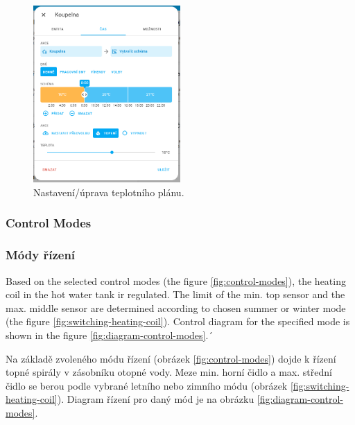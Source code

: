 \begin{Czech}
\begin{figure}[H]
    \centering
    \includegraphics[width=0.5\textwidth]{pictures/czech/software/temperature-plan-thermostat.png}
    \caption{Nastavení/úprava teplotního plánu.}
    \label{fig:temperature-plan-thermostat}
\end{figure}
\end{Czech}


\begin{English}
\subsubsection{Control Modes}
\end{English}

\begin{Czech}
\subsubsection{Módy řízení}
\end{Czech}
\label{sec:control-modes}


\begin{English}
Based on the selected control modes (the figure \ref{fig:control-modes}), the heating coil in the hot water tank ir regulated. The limit of the min. top sensor and the max. middle sensor are determined according to chosen summer or winter mode (the figure \ref{fig:switching-heating-coil}). Control diagram  for the specified mode is shown in the figure \ref{fig:diagram-control-modes}.´
\end{English}

\begin{Czech}
Na základě zvoleného módu řízení (obrázek \ref{fig:control-modes}) dojde k řízení topné spirály v zásobníku otopné vody. Meze min. horní čidlo a max. střední čidlo se berou podle vybrané letního nebo zimního módu (obrázek \ref{fig:switching-heating-coil}). Diagram řízení pro daný mód je na obrázku \ref{fig:diagram-control-modes}.
\end{Czech}


